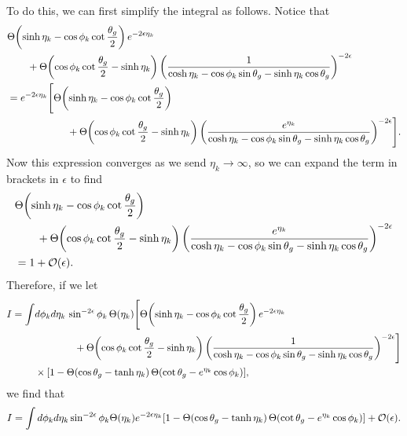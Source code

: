 \documentclass[11pt,twoside,reqno]{amsart}
\theoremstyle{plain}
\theoremstyle{remark}
\theoremstyle{definition}
\theoremstyle{remark}
\theoremstyle{definition}
\theoremstyle{definition}
\newcommand{\cO}{\mathcal{O}}
\begin{document}
	To do this, we can first simplify the integral as follows. Notice that
	\begin{equation}\label{eq:theta expansion trick 1}
	\begin{aligned}
		&\Theta\qty(\sinh\eta_k - \cos\phi_k\cot\frac{\theta_g}{2})\,e^{-2\epsilon\eta_k} \\
			&\qquad+ \Theta\qty(\cos\phi_k\cot\frac{\theta_g}{2} - \sinh\eta_k)\, \qty(\frac{1}{\cosh\eta_k - \cos\phi_k\sin\theta_g - \sinh\eta_k\cos\theta_g})^{-2\epsilon} \\
		&= e^{-2\epsilon\eta_k} \Bigg[\Theta\qty(\sinh\eta_k - \cos\phi_k\cot\frac{\theta_g}{2}) \\
			&\qquad\qquad\qquad + \Theta\qty(\cos\phi_k\cot\frac{\theta_g}{2} - \sinh\eta_k)\, \qty(\frac{e^{\eta_k}}{\cosh\eta_k - \cos\phi_k\sin\theta_g - \sinh\eta_k\cos\theta_g})^{-2\epsilon}\Bigg].
	\end{aligned}
	\end{equation}
	Now this expression converges as we send $\eta_k \to \infty$, so we can expand the term in brackets in $\epsilon$ to find
	\begin{equation}\label{eq:theta expansion trick 2}
	\begin{aligned}
		&\Theta\qty(\sinh\eta_k - \cos\phi_k\cot\frac{\theta_g}{2}) \\
			&\qquad+ \Theta\qty(\cos\phi_k\cot\frac{\theta_g}{2} - \sinh\eta_k)\, \qty(\frac{e^{\eta_k}}{\cosh\eta_k - \cos\phi_k\sin\theta_g - \sinh\eta_k\cos\theta_g})^{-2\epsilon} \\
		&= 1 + \cO(\epsilon).
	\end{aligned}
	\end{equation}
	Therefore, if we let
	\begin{equation}
	\begin{aligned}
		I = \int &d\phi_k d\eta_k\, \sin^{-2\epsilon}\phi_k \, \Theta(\eta_k) \Bigg[ \Theta\qty(\sinh\eta_k - \cos\phi_k\cot\frac{\theta_g}{2})\,e^{-2\epsilon\eta_k} \\
			&\qquad\qquad+ \Theta\qty(\cos\phi_k\cot\frac{\theta_g}{2} - \sinh\eta_k)\, \qty(\frac{1}{\cosh\eta_k - \cos\phi_k\sin\theta_g - \sinh\eta_k\cos\theta_g})^{-2\epsilon}\Bigg] \\
			&\times \qty[1 - \Theta(\cos\theta_g - \tanh\eta_k)\,\Theta\qty(\cot\theta_g - e^{\eta_k}\cos\phi_k)],
	\end{aligned}
	\end{equation}
	we find that
	\begin{equation}
		I = \int d\phi_k d\eta_k \sin^{-2\epsilon}\phi_k \Theta(\eta_k) e^{-2\epsilon\eta_k} \qty[1 - \Theta(\cos\theta_g - \tanh\eta_k)\,\Theta\qty(\cot\theta_g - e^{\eta_k}\cos\phi_k)] + \cO(\epsilon).
	\end{equation}
\end{document}
